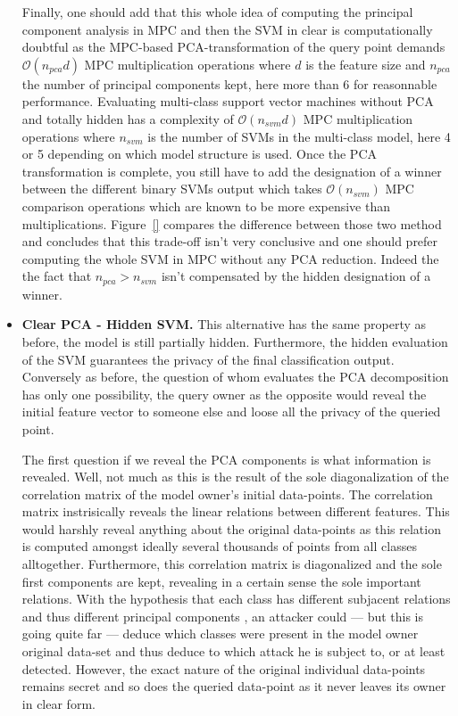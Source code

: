 \begin{itemize}
    Finally, one should add that this whole idea of computing the principal component analysis in MPC and then the SVM in clear is computationally doubtful as the MPC-based PCA-transformation of the query point demands $\mathcal{O}\left(n_{pca}d\right)$ MPC multiplication operations where $d$ is the feature size and $n_{pca}$ the number of principal components kept, here more than 6 for reasonnable performance. Evaluating multi-class support vector machines without PCA and totally hidden has a complexity of $\mathcal{O}(n_{svm}d)$ MPC multiplication operations where $n_{svm}$ is the number of SVMs in the multi-class model, here 4 or 5 depending on which model structure is used. Once the PCA transformation is complete, you still have to add the designation of a winner between the different binary SVMs output which takes $\mathcal{O}(n_{svm})$ MPC comparison operations which are known to be more expensive than multiplications. Figure~\ref{} compares the difference between those two method and concludes that this trade-off isn't very conclusive and one should prefer computing the whole SVM in MPC without any PCA reduction. Indeed the the fact that $n_{pca} > n_{svm}$ isn't compensated by the hidden designation of a winner.
    
    \item \textbf{Clear PCA - Hidden SVM.}
    This alternative has the same property as before, the model is still partially hidden. Furthermore, the hidden evaluation of the SVM guarantees the privacy of the final classification output. Conversely as before, the question of whom evaluates the PCA decomposition has only one possibility, the query owner as the opposite would reveal the initial feature vector to someone else and loose all the privacy of the queried point.
    
    The first question if we reveal the PCA components is what information is revealed. Well, not much as this is the result of the sole diagonalization of the correlation matrix of the model owner's initial data-points. The correlation matrix instrisically reveals the linear relations between different features. This would harshly reveal anything about the original data-points as this relation is computed amongst ideally several thousands of points from all classes alltogether. Furthermore, this correlation matrix is diagonalized and the sole first components are kept, revealing in a certain sense the sole important relations. With the hypothesis that each class has different subjacent relations and thus different principal components , an attacker could --- but this is going quite far --- deduce which classes were present in the model owner original data-set and thus deduce to which attack he is subject to, or at least detected. However, the exact nature of the original individual data-points remains secret and so does the queried data-point as it never leaves its owner in clear form.
    

\end{itemize}
